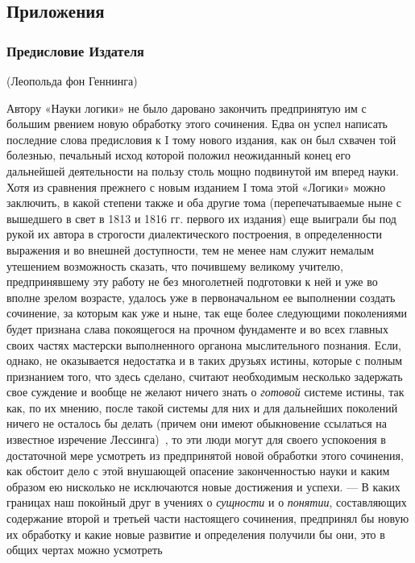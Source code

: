 \clearpage\subsection{Приложения}
\subsubsection{Предисловие Издателя}\label{bkm:Ref474669698}
{\centering
(Леопольда фон Геннинга)
\par}

Автору «Науки логики» не было даровано закончить предпринятую им с большим
рвением новую обработку этого сочинения. Едва он успел написать последние
слова предисловия к I тому нового издания, как он был схвачен той болезнью,
печальный исход которой положил неожиданный конец его дальнейшей
деятельности на пользу столь мощно подвинутой им вперед науки. Хотя из
сравнения прежнего с новым изданием I тома этой «Логики» можно заключить, в
какой степени также и оба другие тома (перепечатываемые ныне с вышедшего в
свет в 1813 и 1816 гг. первого их издания) еще выиграли бы под рукой их
автора в строгости диалектического построения, в определенности выражения и
во внешней доступности, тем не менее нам служит немалым утешением
возможность сказать, что почившему великому учителю, предпринявшему эту
работу не без многолетней подготовки к ней и уже во вполне зрелом возрасте,
удалось уже в первоначальном ее выполнении создать сочинение, за которым
как уже и ныне, так еще более следующими поколениями будет признана слава
покоящегося на прочном фундаменте и во всех главных своих частях мастерски
выполненного органона мыслительного познания. Если, однако, не оказывается
недостатка и в таких друзьях истины, которые с полным признанием того, что
здесь сделано, считают необходимым несколько задержать свое суждение и
вообще не желают ничего знать о {\em готовой} системе
истины, так как, по их мнению, после такой системы для них и для дальнейших
поколений ничего не осталось бы делать (причем они имеют обыкновение
ссылаться на известное изречение
Лессинга)~\label{bkm:Ref474655210},
то эти люди могут для своего успокоения в достаточной мере усмотреть из
предпринятой новой обработки этого сочинения, как обстоит дело с этой
внушающей опасение законченностью науки и каким образом ею нисколько не
исключаются новые достижения и успехи. — В каких границах наш покойный друг в
учениях о {\em сущности} и о
{\em понятии}, составляющих содержание второй и третьей
части настоящего сочинения, предпринял бы новую их обработку и какие новые
развитие и определения получили бы они, это в общих чертах можно усмотреть
